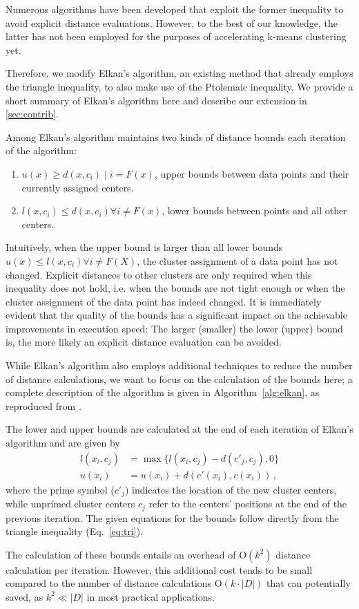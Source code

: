 Numerous algorithms have been developed that exploit the former inequality to avoid explicit distance evaluations. However, to the best of our knowledge, the latter has not been employed for the purposes of accelerating k-means clustering yet.

Therefore, we modify Elkan's algorithm, an existing method that already employs the triangle inequality, to also make use of the Ptolemaic inequality.
We provide a short summary of Elkan's algorithm \cite{DBLP:conf/icml/Elkan03} here and describe our extension in \autoref{sec:contrib}.

Among Elkan's algorithm maintains two kinds of distance bounds each iteration of the algorithm:
\begin{enumerate}[label=\roman*]
	\item $u(x) \geq d(x, c_i) \mid i = F(x)$,
	      upper bounds between data points and their currently assigned centers.
	\item $l(x, c_i) \leq d(x,c_i) \forall i \neq F(x)$,
	      lower bounds between points and all other centers.
\end{enumerate}
Intuitively, when the upper bound is larger than all lower bounds $u(x)\leq l(x,c_i) \forall i\neq F(X)$, the cluster assignment of a data point has not changed.
Explicit distances to other clusters are only required when this inequality does not hold, i.e. when the bounds are not tight enough or when the cluster assignment of the data point has indeed changed.
It is immediately evident that the quality of the bounds has a significant impact on the achievable improvements in execution speed:
The larger (smaller) the lower (upper) bound is, the more likely an explicit distance evaluation can be avoided.

While Elkan's algorithm also employs additional techniques to reduce the number of distance calculations, we want to focus on the calculation of the bounds here;
a complete description of the algorithm is given in Algorithm~\ref{alg:elkan}, as reproduced from \cite{elkan}.

The lower and upper bounds are calculated at the end of each iteration of Elkan's algorithm and are given by
\begin{align}
	\label{eq:elkan_lower}
	l(x_i, c_j) & = \max \{ l(x_i, c_j) - d(c'_j, c_j), 0 \} \\
	\label{eq:elkan_upper}
	u(x_i)      & = u(x_i) + d(c'(x_i), c(x_i)) \,,
\end{align}
where the prime symbol ($c'_j$) indicates the location of the new cluster centers, while unprimed cluster centers
$c_j$ refer to the centers' positions at the end of the previous iteration.
The given equations for the bounds follow directly from the triangle inequality (Eq.~\ref{eq:tri}).

The calculation of these bounds entails an overhead of $\mathrm{O}(k^2)$ distance calculation per iteration.
However, this additional cost tends to be small compared to the number of distance calculations $\mathrm{O}(k\cdot|D|)$ that can potentially saved,
as  $k^2 \ll |D|$ in most practical applications.


